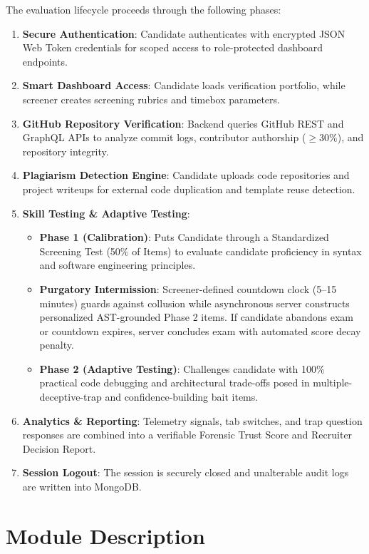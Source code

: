 The evaluation lifecycle proceeds through the following phases:
\begin{enumerate}
    \item \textbf{Secure Authentication}: Candidate authenticates with encrypted JSON Web Token credentials for scoped access to role-protected dashboard endpoints.
    \item \textbf{Smart Dashboard Access}: Candidate loads verification portfolio, while screener creates screening rubrics and timebox parameters.
    \item \textbf{GitHub Repository Verification}: Backend queries GitHub REST and GraphQL APIs to analyze commit logs, contributor authorship ($\ge 30\%$), and repository integrity.
    \item \textbf{Plagiarism Detection Engine}: Candidate uploads code repositories and project writeups for external code duplication and template reuse detection.
    \item \textbf{Skill Testing \& Adaptive Testing}:
    \begin{itemize}
        \item \textbf{Phase 1 (Calibration)}: Puts Candidate through a Standardized Screening Test (50\% of Items) to evaluate candidate proficiency in syntax and software engineering principles.
        \item \textbf{Purgatory Intermission}: Screener-defined countdown clock (5--15 minutes) guards against collusion while asynchronous server constructs personalized AST-grounded Phase 2 items. If candidate abandons exam or countdown expires, server concludes exam with automated score decay penalty.
        \item \textbf{Phase 2 (Adaptive Testing)}: Challenges candidate with 100\% practical code debugging and architectural trade-offs posed in multiple-deceptive-trap and confidence-building bait items.
    \end{itemize}
    \item \textbf{Analytics \& Reporting}: Telemetry signals, tab switches, and trap question responses are combined into a verifiable Forensic Trust Score and Recruiter Decision Report.
    \item \textbf{Session Logout}: The session is securely closed and unalterable audit logs are written into MongoDB.
\end{enumerate}

\section{Module Description}
